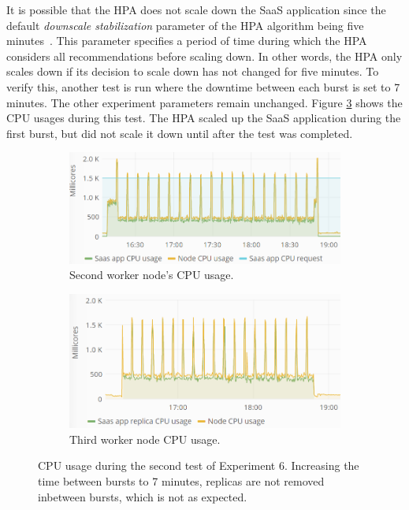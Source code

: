 It is possible that the HPA does not scale down the SaaS application since the default \textit{downscale stabilization} parameter of the HPA algorithm being five minutes~\citep{HPA}. This parameter specifies a period of time during which the HPA considers all recommendations before scaling down. In other words, the HPA only scales down if its decision to scale down has not changed for five minutes.
To verify this, another test is run where the downtime between each burst is set to 7 minutes. The other experiment parameters remain unchanged. Figure \ref{fig:cpu-saas-hpa-bursty-2} shows the CPU usages during this test. The HPA scaled up the SaaS application during the first burst, but did not scale it down until after the test was completed. 

\begin{figure}
\centering
\begin{subfigure}[b]{\columnwidth}
\centering
\includegraphics[width=0.70\columnwidth]{Images/Experiments/CPU/Grafana/cpu-saas-hpa-bursty-3-1.PNG}
\caption{Second worker node's CPU usage.}
\label{fig:cpu-saas-hpa-bursty-3-1}
\end{subfigure}
\hfill
\begin{subfigure}[b]{\columnwidth}
\centering
\includegraphics[width=0.70\columnwidth]{Images/Experiments/CPU/Grafana/cpu-saas-hpa-bursty-3-2.PNG}
\caption{Third worker node CPU usage.}
\label{fig:cpu-saas-hpa-bursty-3-2}
\end{subfigure}
\hfill
\vspace*{-7mm}
\caption{CPU usage during the second test of Experiment 6. Increasing the time between bursts to 7 minutes, replicas are not removed inbetween bursts, which is not as expected.}
\label{fig:cpu-saas-hpa-bursty-2}
\end{figure}

